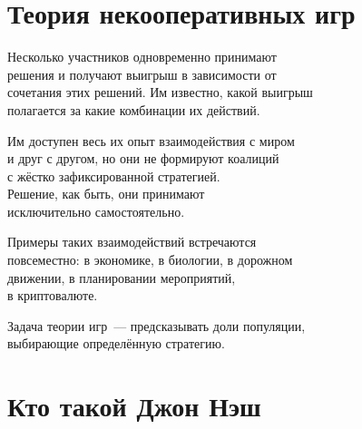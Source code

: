 \documentclass[11pt,aspectratio=43,svgnames]{beamer}
\begin{document}
 \maketitle

\begin{frame} 
	\tableofcontents
\end{frame}

\section{Теория некооперативных игр}

\begin{frame} 
Несколько участников одновременно принимают\\
решения и получают выигрыш в зависимости от\\
сочетания этих решений. Им известно, какой выигрыш\\
полагается за какие комбинации их действий. \medskip

Им доступен весь их опыт взаимодействия с миром\\
и друг с другом, но они не формируют коалиций\\
с жёстко зафиксированной стратегией.\\
Решение, как быть, они принимают\\
исключительно самостоятельно.
\end{frame}

\begin{frame} 
Примеры таких взаимодействий встречаются\\
повсеместно: в экономике, в биологии, в дорожном\\
движении, в планировании мероприятий,\\
в криптовалюте. \medskip

Задача теории игр~— предсказывать доли популяции,\\
выбирающие определённую стратегию.
\end{frame}



\section{Кто такой Джон Нэш}
\end{document}
